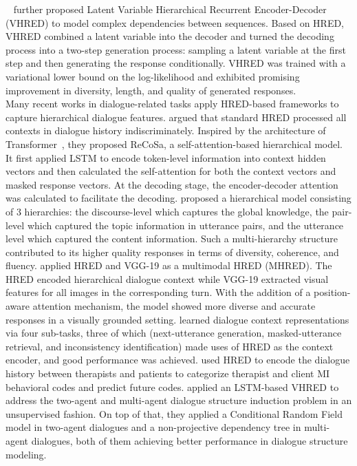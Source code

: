~ further proposed Latent Variable Hierarchical Recurrent Encoder-Decoder (VHRED) to model complex dependencies between sequences. Based on HRED, VHRED combined a latent variable into the decoder and turned the decoding process into a two-step generation process: sampling a latent variable at the first step and then generating the response conditionally. VHRED was trained with a variational lower bound on the log-likelihood and exhibited promising improvement in diversity, length, and quality of generated responses. \\
Many recent works in dialogue-related tasks apply HRED-based frameworks to capture hierarchical dialogue features.  argued that standard HRED processed all contexts in dialogue history indiscriminately. Inspired by the architecture of Transformer~, they proposed ReCoSa, a self-attention-based hierarchical model. It first applied LSTM to encode token-level information into context hidden vectors and then calculated the self-attention for both the context vectors and masked response vectors. At the decoding stage, the encoder-decoder attention was calculated to facilitate the decoding.  proposed a hierarchical model consisting of 3 hierarchies: the discourse-level which captures the global knowledge, the pair-level which captured the topic information in utterance pairs, and the utterance level which captured the content information. Such a multi-hierarchy structure contributed to its higher quality responses in terms of diversity, coherence, and fluency.  applied HRED and VGG-19 as a multimodal HRED (MHRED). The HRED encoded hierarchical dialogue context while VGG-19 extracted visual features for all images in the corresponding turn. With the addition of a position-aware attention mechanism, the model showed more diverse and accurate responses in a visually grounded setting.  learned dialogue context representations via four sub-tasks, three of which (next-utterance generation, masked-utterance retrieval, and inconsistency identification) made uses of HRED as the context encoder, and good performance was achieved.  used HRED to encode the dialogue history between therapists and patients to categorize therapist and client MI behavioral codes and predict future codes.  applied an LSTM-based VHRED to address the two-agent and multi-agent dialogue structure induction problem in an unsupervised fashion. On top of that, they applied a Conditional Random Field model in two-agent dialogues and a non-projective dependency tree in multi-agent dialogues, both of them achieving better performance in dialogue structure modeling.

